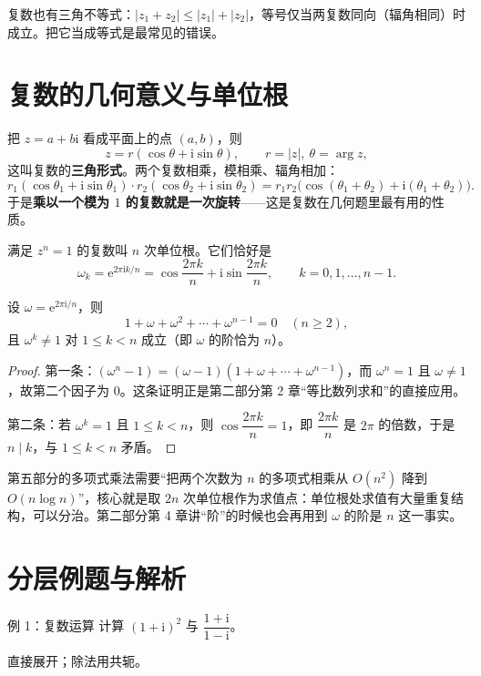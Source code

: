 \begin{pitfall}[$|z_1+z_2|$ 不等于 $|z_1|+|z_2|$]
复数也有三角不等式：$|z_1+z_2|\le|z_1|+|z_2|$，等号仅当两复数同向（辐角相同）时成立。把它当成等式是最常见的错误。
\end{pitfall}

\section{复数的几何意义与单位根}
把 $z=a+b\mathrm i$ 看成平面上的点 $(a,b)$，则
\[
z=r(\cos\theta+\mathrm i\sin\theta),\qquad r=|z|,\ \theta=\arg z,
\]
这叫复数的\textbf{三角形式}。两个复数相乘，模相乘、辐角相加：
\[
r_1(\cos\theta_1+\mathrm i\sin\theta_1)\cdot r_2(\cos\theta_2+\mathrm i\sin\theta_2)
=r_1r_2\bigl(\cos(\theta_1+\theta_2)+\mathrm i(\theta_1+\theta_2)\bigr).
\]
于是\textbf{乘以一个模为 $1$ 的复数就是一次旋转}——这是复数在几何题里最有用的性质。

\begin{definition}[$n$ 次单位根]
满足 $z^n=1$ 的复数叫 $n$ 次单位根。它们恰好是
\[
\omega_k=\mathrm e^{2\pi\mathrm ik/n}=\cos\frac{2\pi k}{n}+\mathrm i\sin\frac{2\pi k}{n},
\qquad k=0,1,\ldots,n-1.
\]
\end{definition}
\begin{theorem}[单位根的两条基本性质]
设 $\omega=\mathrm e^{2\pi\mathrm i/n}$，则
\[
1+\omega+\omega^2+\cdots+\omega^{n-1}=0\quad(n\ge2),
\]
且 $\omega^k\ne1$ 对 $1\le k<n$ 成立（即 $\omega$ 的阶恰为 $n$）。
\end{theorem}
\begin{proof}
第一条：$(\omega^n-1)=(\omega-1)(1+\omega+\cdots+\omega^{n-1})$，而 $\omega^n=1$ 且 $\omega\ne1$，故第二个因子为 $0$。这条证明正是第二部分第 2 章“等比数列求和”的直接应用。

第二条：若 $\omega^k=1$ 且 $1\le k<n$，则 $\cos\dfrac{2\pi k}{n}=1$，即 $\dfrac{2\pi k}{n}$ 是 $2\pi$ 的倍数，于是 $n\mid k$，与 $1\le k<n$ 矛盾。
\end{proof}

\begin{tip}[单位根为什么重要]
第五部分的多项式乘法需要“把两个次数为 $n$ 的多项式相乘从 $O(n^2)$ 降到 $O(n\log n)$”，核心就是取 $2n$ 次单位根作为求值点：单位根处求值有大量重复结构，可以分治。第二部分第 4 章讲“阶”的时候也会再用到 $\omega$ 的阶是 $n$ 这一事实。
\end{tip}

\section{分层例题与解析}
\begin{problem}{例 1：复数运算}
计算 $(1+\mathrm i)^2$ 与 $\dfrac{1+\mathrm i}{1-\mathrm i}$。
\end{problem}
\hint 直接展开；除法用共轭。

